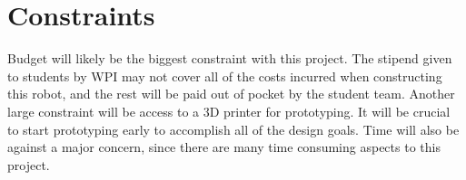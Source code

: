 \section{Constraints}

Budget will likely be the biggest constraint with this project. The stipend given to students by WPI may not cover all of the costs incurred when constructing this robot, and the rest will be paid out of pocket by the student team. Another large constraint will be access to a 3D printer for prototyping. It will be crucial to start prototyping early to accomplish all of the design goals. Time will also be against a major concern, since there are many time consuming aspects to this project.